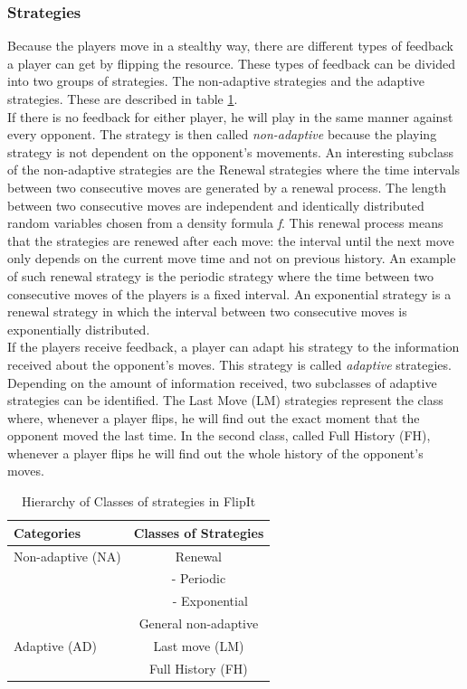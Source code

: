 \subsubsection{Strategies}
Because the players move in a stealthy way, there are different types of feedback a player can get by flipping the resource. These types of feedback can be divided into two groups of strategies. The non-adaptive strategies and the adaptive strategies. These are described in table \ref{table:Strategies}.\\

If there is no feedback for either player, he will play in the same manner against every opponent. The strategy is then called \textit{non-adaptive} because the playing strategy is not dependent on the opponent's movements. An interesting subclass of the non-adaptive strategies are the Renewal strategies where the time intervals between two consecutive moves are generated by a renewal process. The length between two consecutive moves are independent and identically distributed random variables chosen from a density formula \textit{f}. This renewal process means that the strategies are renewed after each move: the interval until the next move only depends on the current move time and not on previous history. 
An example of such renewal strategy is the periodic strategy where the time between two consecutive moves of the players is a fixed interval. An exponential strategy is a renewal strategy in which the interval between two consecutive moves is exponentially distributed. \\

If the players receive feedback, a player can adapt his strategy to the information received about the opponent's moves. This strategy is called \textit{adaptive} strategies. Depending on the amount of information received, two subclasses of adaptive strategies can be identified. The Last Move (LM) strategies represent the class where, whenever a player flips, he will find out the exact moment that the opponent moved the last time. In the second class, called Full History (FH), whenever a player flips he will find out the whole history of the opponent's moves. \\


 \begin{table}
 \centering
 \begin{tabular}{ l | c  }
  \textbf{Categories} & \textbf{Classes of Strategies} \\
  \hline Non-adaptive (NA) & Renewal \\
  & - Periodic \\
  & ~~~ - Exponential \\
  & General non-adaptive \\
  \hline Adaptive (AD) & Last move (LM) \\
  & Full History (FH) \\  
\end{tabular}
 \caption{Hierarchy of Classes of strategies in FlipIt}
 \label{table:Strategies}
 \end{table}

